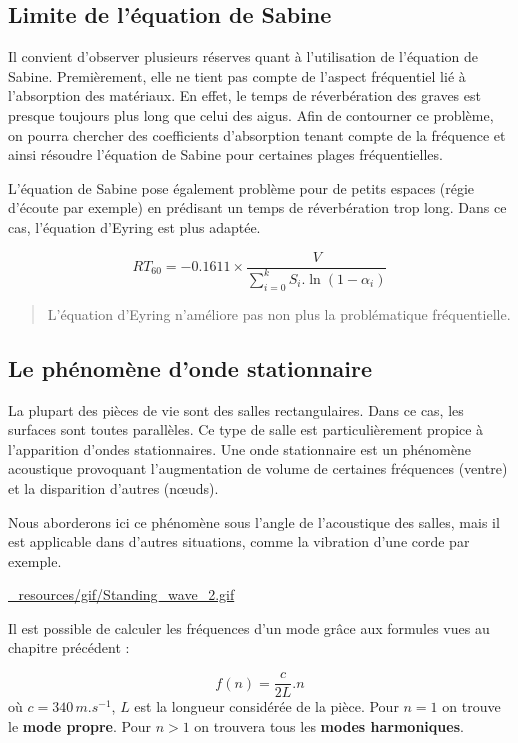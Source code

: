 \documentclass[
]{book}
\begin{document}
\hypertarget{limite-de-luxe9quation-de-sabine}{%
\subsection{Limite de l'équation de Sabine}\label{limite-de-luxe9quation-de-sabine}}

Il convient d'observer plusieurs réserves quant à l'utilisation de l'équation de Sabine. Premièrement, elle ne tient pas compte de l'aspect fréquentiel lié à l'absorption des matériaux. En effet, le temps de réverbération des graves est presque toujours plus long que celui des aigus. Afin de contourner ce problème, on pourra chercher des coefficients d'absorption tenant compte de la fréquence et ainsi résoudre l'équation de Sabine pour certaines plages fréquentielles.

L'équation de Sabine pose également problème pour de petits espaces (régie d'écoute par exemple) en prédisant un temps de réverbération trop long. Dans ce cas, l'équation d'Eyring est plus adaptée.

\[RT_{60} = -0.1611 \times \frac{V}{\sum_{i=0}^{k} S_i.\ln(1-\alpha_i)}\]

\begin{quote}
L'équation d'Eyring n'améliore pas non plus la problématique fréquentielle.
\end{quote}

\hypertarget{le-phuxe9nomuxe8ne-donde-stationnaire}{%
\subsection{Le phénomène d'onde stationnaire}\label{le-phuxe9nomuxe8ne-donde-stationnaire}}

La plupart des pièces de vie sont des salles rectangulaires. Dans ce cas, les surfaces sont toutes parallèles. Ce type de salle est particulièrement propice à l'apparition d'ondes stationnaires. Une onde stationnaire est un phénomène acoustique provoquant l'augmentation de volume de certaines fréquences (ventre) et la disparition d'autres (nœuds).

Nous aborderons ici ce phénomène sous l'angle de l'acoustique des salles, mais il est applicable dans d'autres situations, comme la vibration d'une corde par exemple.

\url{_resources/gif/Standing_wave_2.gif}

Il est possible de calculer les fréquences d'un mode grâce aux formules vues au chapitre précédent :

\[f(n) = \frac{c}{2L}.n\]
où \(c=340\,m.s^{-1}\), \(L\) est la longueur considérée de la pièce. Pour \(n=1\) on trouve le \textbf{mode propre}. Pour \(n>1\) on trouvera tous les \textbf{modes harmoniques}.
\end{document}
